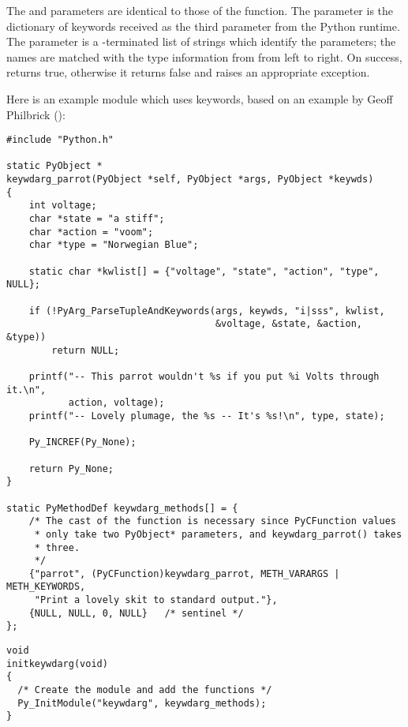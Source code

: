 The  and  parameters are identical to those of the
 function.  The  parameter
is the dictionary of keywords received as the third parameter from the
Python runtime.  The  parameter is a \NULL-terminated
list of strings which identify the parameters; the names are matched
with the type information from  from left to right.  On
success,  returns true,
otherwise it returns false and raises an appropriate exception.


Here is an example module which uses keywords, based on an example by
Geoff Philbrick ():%

\begin{verbatim}
#include "Python.h"

static PyObject *
keywdarg_parrot(PyObject *self, PyObject *args, PyObject *keywds)
{  
    int voltage;
    char *state = "a stiff";
    char *action = "voom";
    char *type = "Norwegian Blue";

    static char *kwlist[] = {"voltage", "state", "action", "type", NULL};

    if (!PyArg_ParseTupleAndKeywords(args, keywds, "i|sss", kwlist, 
                                     &voltage, &state, &action, &type))
        return NULL; 
  
    printf("-- This parrot wouldn't %s if you put %i Volts through it.\n", 
           action, voltage);
    printf("-- Lovely plumage, the %s -- It's %s!\n", type, state);

    Py_INCREF(Py_None);

    return Py_None;
}

static PyMethodDef keywdarg_methods[] = {
    /* The cast of the function is necessary since PyCFunction values
     * only take two PyObject* parameters, and keywdarg_parrot() takes
     * three.
     */
    {"parrot", (PyCFunction)keywdarg_parrot, METH_VARARGS | METH_KEYWORDS,
     "Print a lovely skit to standard output."},
    {NULL, NULL, 0, NULL}   /* sentinel */
};
\end{verbatim}

\begin{verbatim}
void
initkeywdarg(void)
{
  /* Create the module and add the functions */
  Py_InitModule("keywdarg", keywdarg_methods);
}
\end{verbatim}


